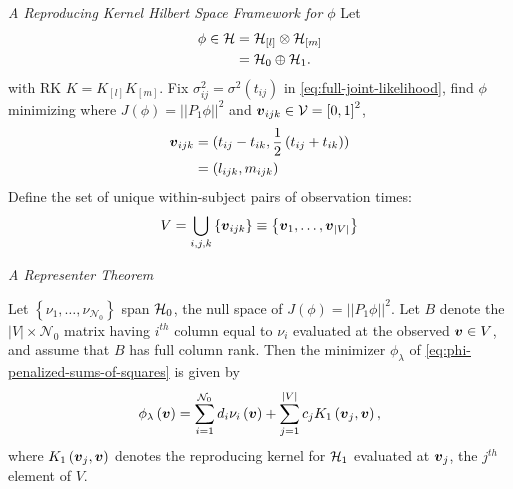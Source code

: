 \begin{frame}{\textit{A Reproducing Kernel Hilbert Space Framework for $\phi$}}{}
\footnotesize
Let
\begin{align*}
\phi \in \mathcal{H} &= \mathcal{H}_{\left[l\right]} \otimes \mathcal{H}_{\left[m\right]} \\
&= \mathcal{H}_0 \oplus \mathcal{H}_1.
\end{align*}
\footnotesize
with RK $K = K_{\left[l\right]}K_{\left[m\right]}$. Fix $\sigma_{ij}^2 = \sigma^2\left(t_{ij}\right)$ in \eqref{eq:full-joint-likelihood},  find $\phi$ minimizing
\footnotesize
where $J\left(\phi\right) =\vert \vert P_1 \phi \vert\vert^2$ and $\mbox{\boldmath $v$}_{ijk} \in \mathcal{V} = \left[0,1\right]^2$, 
\begin{align*}
\mbox{\boldmath $v$}_{ijk} &= (t_{ij} - t_{ik}, \frac{1}{2}\left(t_{ij} + t_{ik}\right)) \\ 
&= \left(l_{ijk}, m_{ijk}\right)
\end{align*}
Define the set of unique within-subject pairs of observation times:  
\[
V = \bigcup\limits_{i,j,k} \left\{\mbox{\boldmath $v$}_{ijk} \right\} \equiv \left\{ \mbox{\boldmath $v$}_1,\dots,\mbox{\boldmath $v$}_{\vert V \vert} \right\}
\]

\end{frame}

\begin{frame}{\textit{A Representer Theorem}}{}

 \begin{theorem} \label{theorem:finite-dimensional-minimizer}
 Let $\left\{\nu_1,\dots, \nu_{\mathcal{N}_0}\right\}$ span $\mathcal{H}_0$, the null space of $J\left(\phi\right) = \vert \vert P_1 \phi\vert\vert^2$. Let $B$ denote the $\vert V \vert \times \mathcal{N}_0$ matrix having $i^{th}$ column equal to $\nu_i$ evaluated at the observed $\mbox{\boldmath $v$} \in V$, and assume that $B$ has full column rank. Then the minimizer $\phi_\lambda$ of \eqref{eq:phi-penalized-sums-of-squares} is given by
 \begin{equation} \label{eq:form-of-the-minimizer-phi}
\phi_\lambda\left(\mbox{\boldmath $v$}\right) = \sum_{i = 1}^{\mathcal{N}_0} d_i \nu_{i}\left(\mbox{\boldmath $v$}\right) + \sum_{j = 1}^{\vert V \vert} c_j K_1\left(\mbox{\boldmath $v$}_j, \mbox{\boldmath $v$}\right),
\end{equation}
\noindent
where $K_1\left(\mbox{\boldmath $v$}_j, \mbox{\boldmath $v$} \right)$ denotes the reproducing kernel for $\mathcal{H}_1$ evaluated at ${\mbox{\boldmath $v$}_j}$, the $j^{th}$ element of $V$.
\end{theorem}

\end{frame}


